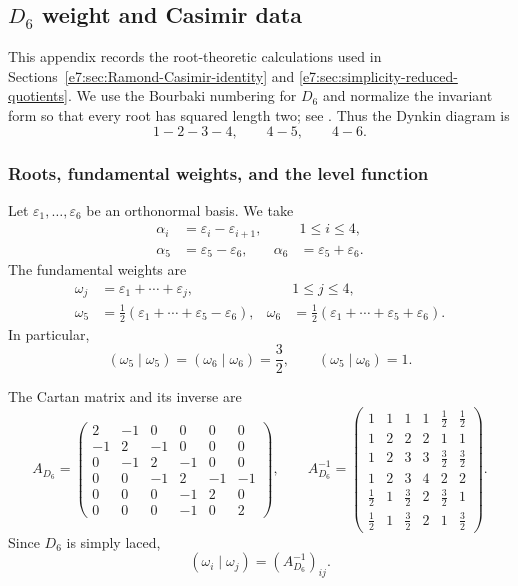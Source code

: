 \documentclass[11pt,reqno]{amsart}
\theoremstyle{definition}
\theoremstyle{remark}
\begin{document}
\subsection{\texorpdfstring{$D_6$}{D6} weight and Casimir data}
\label{e7:app:D6-weight-Casimir-data}

This appendix records the root-theoretic calculations used in
Sections~\ref{e7:sec:Ramond-Casimir-identity} and
\ref{e7:sec:simplicity-reduced-quotients}.  We use the Bourbaki numbering
for $D_6$ and normalize the invariant form so that every root has squared
length two; see \cite[Planche~IV]{Bourbaki2002}.  Thus the Dynkin diagram
is
\[
  1-2-3-4,
  \qquad
  4-5,
  \qquad
  4-6.
\]

\subsubsection{Roots, fundamental weights, and the level function}


Let $\varepsilon_1,\ldots,\varepsilon_6$ be an orthonormal basis.  We take
\begin{align*}
  \alpha_i&=\varepsilon_i-\varepsilon_{i+1},
  &&1\le i\le4,\\
  \alpha_5&=\varepsilon_5-\varepsilon_6,
  &\alpha_6&=\varepsilon_5+\varepsilon_6.
\end{align*}
The fundamental weights are
\begin{align*}
  \omega_j&=\varepsilon_1+\cdots+\varepsilon_j,
  &&1\le j\le4,\\
  \omega_5
  &=\frac12(\varepsilon_1+\cdots+\varepsilon_5-\varepsilon_6),
  &
  \omega_6
  &=\frac12(\varepsilon_1+\cdots+\varepsilon_5+\varepsilon_6).
\end{align*}
In particular,
\begin{equation*}
  (\omega_5\mid\omega_5)
  =(\omega_6\mid\omega_6)=\frac32,
  \qquad
  (\omega_5\mid\omega_6)=1.
\end{equation*}

The Cartan matrix and its inverse are
\begin{equation*}
  A_{D_6}
  =
  \begin{pmatrix}
    2&-1&0&0&0&0\\
    -1&2&-1&0&0&0\\
    0&-1&2&-1&0&0\\
    0&0&-1&2&-1&-1\\
    0&0&0&-1&2&0\\
    0&0&0&-1&0&2
  \end{pmatrix},
  \qquad
  A_{D_6}^{-1}
  =
  \begin{pmatrix}
    1&1&1&1&\frac12&\frac12\\
    1&2&2&2&1&1\\
    1&2&3&3&\frac32&\frac32\\
    1&2&3&4&2&2\\
    \frac12&1&\frac32&2&\frac32&1\\
    \frac12&1&\frac32&2&1&\frac32
  \end{pmatrix}.
\end{equation*}
Since $D_6$ is simply laced,
\begin{equation*}
  (\omega_i\mid\omega_j)
  =(A_{D_6}^{-1})_{ij}.
\end{equation*}
\end{document}
